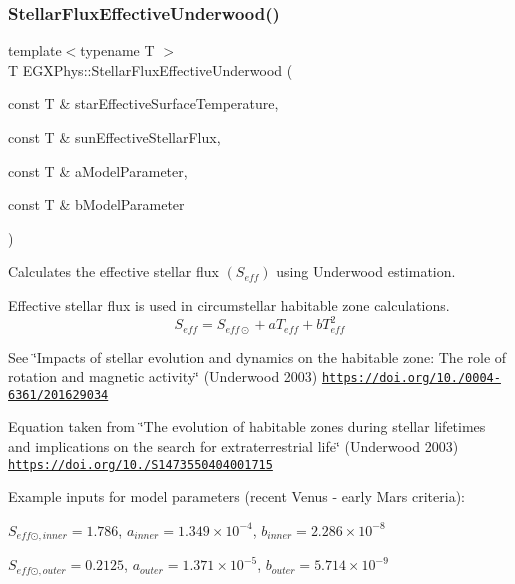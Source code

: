 \subsubsection{\texorpdfstring{Stellar\+Flux\+Effective\+Underwood()}{StellarFluxEffectiveUnderwood()}}
{\footnotesize\ttfamily template$<$typename T $>$ \\
T E\+G\+X\+Phys\+::\+Stellar\+Flux\+Effective\+Underwood (\begin{DoxyParamCaption}\item[{const T \&}]{star\+Effective\+Surface\+Temperature,  }\item[{const T \&}]{sun\+Effective\+Stellar\+Flux,  }\item[{const T \&}]{a\+Model\+Parameter,  }\item[{const T \&}]{b\+Model\+Parameter }\end{DoxyParamCaption})}



Calculates the effective stellar flux $(S_{eff})$ using Underwood estimation. 

Effective stellar flux is used in circumstellar habitable zone calculations. \[S_{eff}=S_{eff\odot}+aT_{eff}+bT^2_{eff}\]

See \char`\"{}\+Impacts of stellar evolution and dynamics on the habitable zone\+: The role of rotation and magnetic activity\char`\"{} (Underwood 2003) \href{https://doi.org/10.1051/0004-6361/201629034}{\tt https\+://doi.\+org/10./0004-\/6361/201629034}

Equation taken from \char`\"{}\+The evolution of habitable zones during stellar lifetimes and implications on the search for extraterrestrial life\char`\"{} (Underwood 2003) \href{https://doi.org/10.1017/S1473550404001715}{\tt https\+://doi.\+org/10./\+S1473550404001715}

Example inputs for model parameters (recent Venus -\/ early Mars criteria)\+:

$S_{eff\odot,inner} = 1.786$, $a_{inner} = 1.349 \times 10^{-4}$, $b_{inner} = 2.286 \times 10^{-8}$

$S_{eff\odot,outer} = 0.2125$, $a_{outer} = 1.371 \times 10^{-5}$, $b_{outer} = 5.714 \times 10^{-9}$


